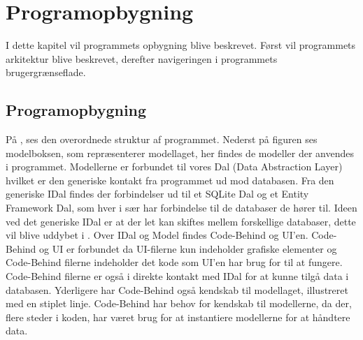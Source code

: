 \chapter{Programopbygning}

I dette kapitel vil programmets opbygning blive beskrevet. 
Først vil programmets arkitektur blive beskrevet, derefter navigeringen i programmets brugergrænseflade. 


\section{Programopbygning}\label{sec:programopbygning}



På , ses den overordnede struktur af programmet.
Nederst på figuren ses modelboksen, som repræsenterer modellaget, her findes de modeller der anvendes i programmet.
Modellerne er forbundet til vores Dal (Data Abstraction Layer) hvilket er den generiske kontakt fra programmet ud mod databasen. 	
Fra den generiske IDal findes der forbindelser ud til et SQLite Dal og et Entity Framework Dal, som hver i sær har forbindelse til de databaser de hører til. 
Ideen ved det generiske IDal er at der let kan skiftes mellem forskellige databaser, dette vil blive uddybet i .
Over IDal og Model findes Code-Behind og UI'en. 
Code-Behind og UI er forbundet da UI-filerne kun indeholder grafiske elementer og Code-Behind filerne indeholder det kode som UI'en har brug for til at fungere.
Code-Behind filerne er også i direkte kontakt med IDal  for at kunne tilgå data i databasen.
Yderligere har Code-Behind også kendskab til modellaget, illustreret med en stiplet linje.
Code-Behind har behov for kendskab til modellerne, da der, flere steder i koden, har været brug for at instantiere modellerne for at håndtere data. 

